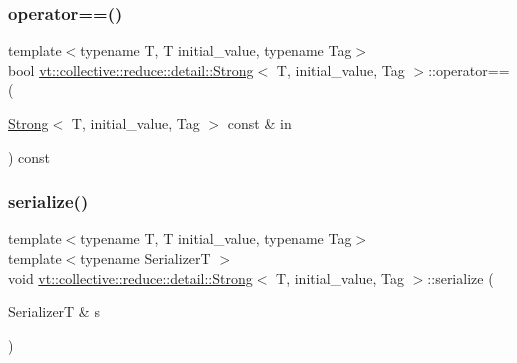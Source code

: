 \mbox{\label{structvt_1_1collective_1_1reduce_1_1detail_1_1_strong_ac8773530a7b4b1a3b5e54eb6f945c582}} 
\subsubsection{\texorpdfstring{operator==()}{operator==()}}
{\footnotesize\ttfamily template$<$typename T, T initial\+\_\+value, typename Tag$>$ \\
bool \hyperlink{structvt_1_1collective_1_1reduce_1_1detail_1_1_strong}{vt\+::collective\+::reduce\+::detail\+::\+Strong}$<$ T, initial\+\_\+value, Tag $>$\+::operator== (\begin{DoxyParamCaption}\item[{\hyperlink{structvt_1_1collective_1_1reduce_1_1detail_1_1_strong}{Strong}$<$ T, initial\+\_\+value, Tag $>$ const \&}]{in }\end{DoxyParamCaption}) const\hspace{0.3cm}{\ttfamily [inline]}}

\mbox{\label{structvt_1_1collective_1_1reduce_1_1detail_1_1_strong_a6abf31948f9dbd77f4caeb265fd68586}} 
\subsubsection{\texorpdfstring{serialize()}{serialize()}}
{\footnotesize\ttfamily template$<$typename T, T initial\+\_\+value, typename Tag$>$ \\
template$<$typename SerializerT $>$ \\
void \hyperlink{structvt_1_1collective_1_1reduce_1_1detail_1_1_strong}{vt\+::collective\+::reduce\+::detail\+::\+Strong}$<$ T, initial\+\_\+value, Tag $>$\+::serialize (\begin{DoxyParamCaption}\item[{SerializerT \&}]{s }\end{DoxyParamCaption})\hspace{0.3cm}{\ttfamily [inline]}}




